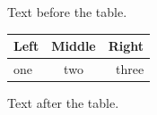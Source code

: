 \documentclass{article}
\begin{document}
Text before the table.

\begin{tabular*}{0.8\textwidth}{@{\extracolsep{\fill}}lcr}\hline Left & Middle & Right\\\hline one & two & three\\\hline\end{tabular*}

Text after the table.
\end{document}
